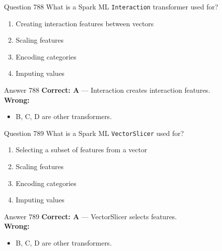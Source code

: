 \documentclass[aspectratio=169,11pt]{beamer}
\begin{document}
	\begin{frame}{Question 788}
		What is a Spark ML \texttt{Interaction} transformer used for?
		\begin{enumerate}[label=\Alph*.]
			\item Creating interaction features between vectors
			\item Scaling features
			\item Encoding categories
			\item Imputing values
		\end{enumerate}
	\end{frame}
	\begin{frame}{Answer 788}
		\textbf{Correct: A} --- Interaction creates interaction features.\\
		\vspace{0.5em}
		\textbf{Wrong:}
		\begin{itemize}
			\item B, C, D are other transformers.
		\end{itemize}
	\end{frame}
	
	\begin{frame}{Question 789}
		What is a Spark ML \texttt{VectorSlicer} used for?
		\begin{enumerate}[label=\Alph*.]
			\item Selecting a subset of features from a vector
			\item Scaling features
			\item Encoding categories
			\item Imputing values
		\end{enumerate}
	\end{frame}
	\begin{frame}{Answer 789}
		\textbf{Correct: A} --- VectorSlicer selects features.\\
		\vspace{0.5em}
		\textbf{Wrong:}
		\begin{itemize}
			\item B, C, D are other transformers.
		\end{itemize}
	\end{frame}
	
\end{document}
